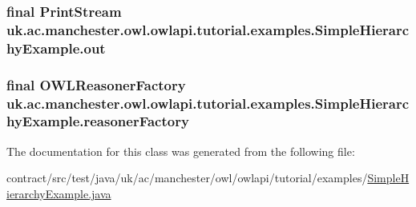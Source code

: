 \hypertarget{classuk_1_1ac_1_1manchester_1_1owl_1_1owlapi_1_1tutorial_1_1examples_1_1_simple_hierarchy_example_aa7858478b89096cac705eee9f16adb51}{
\subsubsection[{out}]{\setlength{\rightskip}{0pt plus 5cm}final Print\-Stream uk.\-ac.\-manchester.\-owl.\-owlapi.\-tutorial.\-examples.\-Simple\-Hierarchy\-Example.\-out\hspace{0.3cm}{\ttfamily [private]}}}\label{classuk_1_1ac_1_1manchester_1_1owl_1_1owlapi_1_1tutorial_1_1examples_1_1_simple_hierarchy_example_aa7858478b89096cac705eee9f16adb51}
\hypertarget{classuk_1_1ac_1_1manchester_1_1owl_1_1owlapi_1_1tutorial_1_1examples_1_1_simple_hierarchy_example_ac958677fb0579973031fc48bd678113e}{
\subsubsection[{reasoner\-Factory}]{\setlength{\rightskip}{0pt plus 5cm}final {\bf O\-W\-L\-Reasoner\-Factory} uk.\-ac.\-manchester.\-owl.\-owlapi.\-tutorial.\-examples.\-Simple\-Hierarchy\-Example.\-reasoner\-Factory\hspace{0.3cm}{\ttfamily [private]}}}\label{classuk_1_1ac_1_1manchester_1_1owl_1_1owlapi_1_1tutorial_1_1examples_1_1_simple_hierarchy_example_ac958677fb0579973031fc48bd678113e}


The documentation for this class was generated from the following file\-:\begin{DoxyCompactItemize}
\item 
contract/src/test/java/uk/ac/manchester/owl/owlapi/tutorial/examples/\hyperlink{_simple_hierarchy_example_8java}{Simple\-Hierarchy\-Example.\-java}\end{DoxyCompactItemize}
